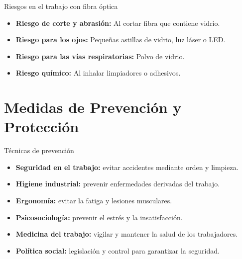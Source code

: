 \documentclass{beamer}
\begin{document}
\begin{frame}{Riesgos en el trabajo con fibra óptica}
    \begin{itemize}
        \item \textbf{Riesgo de corte y abrasión:} Al cortar fibra que contiene vidrio.
        \item \textbf{Riesgo para los ojos:} Pequeñas astillas de vidrio, luz láser o LED.
        \item \textbf{Riesgo para las vías respiratorias:} Polvo de vidrio.
        \item \textbf{Riesgo químico:} Al inhalar limpiadores o adhesivos.
    \end{itemize}
\end{frame}

\section{Medidas de Prevención y Protección}

\begin{frame}{Técnicas de prevención}
    \begin{itemize}
        \item \textbf{Seguridad en el trabajo:} evitar accidentes mediante orden y limpieza.
        \item \textbf{Higiene industrial:} prevenir enfermedades derivadas del trabajo.
        \item \textbf{Ergonomía:} evitar la fatiga y lesiones musculares.
        \item \textbf{Psicosociología:} prevenir el estrés y la insatisfacción.
        \item \textbf{Medicina del trabajo:} vigilar y mantener la salud de los trabajadores.
        \item \textbf{Política social:} legislación y control para garantizar la seguridad.
    \end{itemize}
\end{frame}
\end{document}

